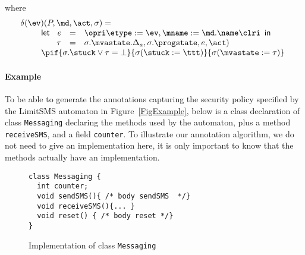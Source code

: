 \noindent where
\[
\begin{array}{l}
\delta(\ev)(P, \md, \act, \sigma) =\\
\qquad
\begin{array}[t]{l}
\mathsf{let\ }
\begin{array}[t]{rcl}
  e & = & \opri \etype := \ev, \mname := \md.\name \clri\\
 \tau & = & \sigma.\mvastate.\Delta_a, \sigma.\progstate, e, \act)
\end{array}
\mathsf{in\ }\\
\pif{\sigma.\stuck \vee \tau = \bot}
    {\sigma (\stuck := \ttt)}
    {\sigma (\mvastate := \tau)}
\end{array}
\end{array}
\]


\paragraph{Example}

To be able to generate the annotations capturing the security policy
specified by the LimitSMS automaton in Figure~\ref{FigExample}, below
is a class declaration of class \texttt{Messaging} declaring the
methods used by the automaton, plus a method \texttt{receiveSMS}, and
a field \texttt{counter}. To illustrate our annotation algorithm, we
do not need to give an implementation here, it is only important to
know that the methods actually have an implementation.
\begin{figure}[t]
\begin{verbatim}
class Messaging {
  int counter;
  void sendSMS(){ /* body sendSMS  */}
  void receiveSMS(){... }
  void reset() { /* body reset */}
}
\end{verbatim}
\caption{Implementation of class \texttt{Messaging}}\label{FigExampleImplem}
\end{figure}


